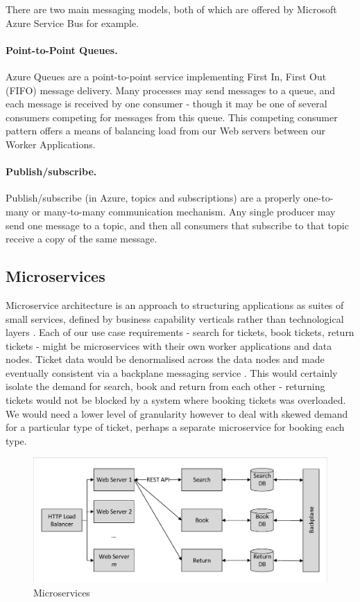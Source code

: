 There are two main messaging models, both of which are offered by Microsoft Azure Service Bus \cite{RN1072} for example.

\paragraph{Point-to-Point Queues.} Azure Queues are a point-to-point service implementing First In, First Out (FIFO) message delivery. Many processes may send messages to a queue, and each message is received by one consumer - though it may be one of several consumers competing for messages from this queue.  This competing consumer pattern offers a means of balancing load from our Web servers between our Worker Applications.

\paragraph{Publish/subscribe.}  Publish/subscribe (in Azure, topics and subscriptions) are a properly one-to-many or many-to-many communication mechanism.  Any single producer may send one message to a topic, and then all consumers that subscribe to that topic receive a copy of the same message.

%
%

\subsection{Microservices}

Microservice architecture is an approach to structuring applications as suites of small services, defined by business capability verticals rather than technological layers \cite{RN1069} \cite{RN1070}.  Each of our use case requirements - search for tickets, book tickets, return tickets - might be microservices with their own worker applications and data nodes.  Ticket data would be denormalised across the data nodes and made eventually consistent via a backplane messaging service \cite{RN1071}.  This would certainly isolate the demand for search, book and return from each other - returning tickets would not be blocked by a system where booking tickets was overloaded.  We would need a lower level of granularity however to deal with skewed demand for a particular type of ticket, perhaps a separate microservice for booking each type. 

\begin{figure}
\caption{Microservices}
\centering
\includegraphics[trim = 5 5 5 5, clip, width=\textwidth]{img/microservices}
\end{figure}

